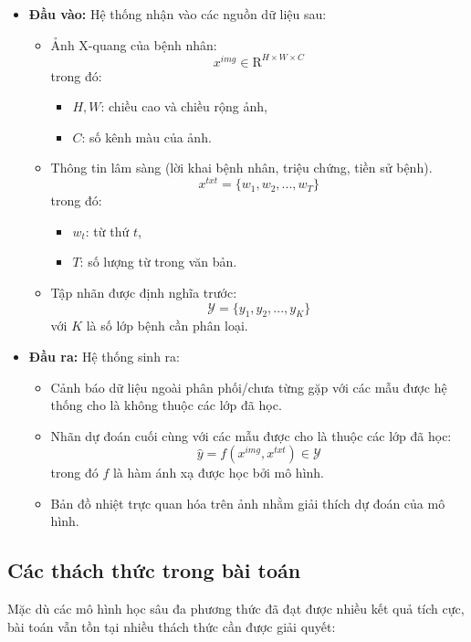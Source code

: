 \begin{itemize}
  \item \textbf{Đầu vào:} Hệ thống nhận vào các nguồn dữ liệu sau:

  \begin{itemize}
    \item Ảnh X-quang của bệnh nhân:
\[ x^{img} \in \mathrm{R}^{H \times W \times C} \] trong đó:
    \begin{itemize}
        \item $H, W$: chiều cao và chiều rộng ảnh,
        \item $C$: số kênh màu của ảnh.
    \end{itemize}

    \item Thông tin lâm sàng (lời khai bệnh nhân, triệu chứng, tiền sử bệnh).
\[ x^{txt} = \{w_1, w_2, ..., w_T\} \] trong đó:
    \begin{itemize}
        \item $w_t$: từ thứ $t$,
        \item $T$: số lượng từ trong văn bản.
    \end{itemize}

    \item Tập nhãn được định nghĩa trước:
\[ \mathcal{Y} = \{y_1, y_2, ..., y_K\} \] với $K$ là số lớp bệnh cần phân loại.
  \end{itemize}

  \item \textbf{Đầu ra:} Hệ thống sinh ra:

  \begin{itemize}
    \item Cảnh báo dữ liệu ngoài phân phối/chưa từng gặp với các mẫu được hệ thống cho là không thuộc các lớp đã học.
    \item Nhãn dự đoán cuối cùng với các mẫu được cho là thuộc các lớp đã học:
    \[ \hat{y} = f(x^{img}, x^{txt}) \in \mathcal{Y} \] trong đó $f$ là hàm ánh xạ được học bởi mô hình.
    \item Bản đồ nhiệt trực quan hóa trên ảnh nhằm giải thích dự đoán của mô hình.
  \end{itemize}
\end{itemize}

\subsection{Các thách thức trong bài toán}

Mặc dù các mô hình học sâu đa phương thức đã đạt được nhiều kết quả tích cực, bài toán vẫn tồn tại nhiều thách thức cần được giải quyết:

